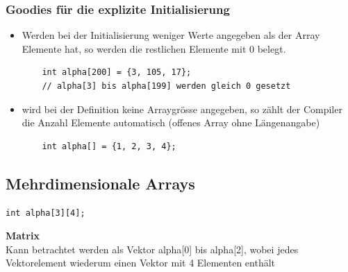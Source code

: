 \subsubsection{Goodies für die explizite Initialisierung}
\label{sec:Goodies fuer die explizite Initialisierung}
\begin{itemize}
	\item Werden bei der Initialisierung weniger Werte angegeben als der Array Elemente hat, so werden die restlichen Elemente mit 0 belegt.\\
	\noindent
	\begin{minipage}{\linewidth}
	\begin{lstlisting}
	int alpha[200] = {3, 105, 17};
	// alpha[3] bis alpha[199] werden gleich 0 gesetzt
	\end{lstlisting}
	\end{minipage}
	\item wird bei der Definition keine Arraygrösse angegeben, so zählt der Compiler die Anzahl Elemente automatisch (offenes Array ohne Längenangabe)
	\noindent
	\begin{minipage}{\linewidth}
	\begin{lstlisting}
	int alpha[] = {1, 2, 3, 4};
	\end{lstlisting}
	\end{minipage}
\end{itemize}


\subsection{Mehrdimensionale Arrays}
\label{sec:Mehrdimensionale Arrays}
\noindent
\begin{minipage}{\linewidth}
\begin{lstlisting}
int alpha[3][4];
\end{lstlisting}
\end{minipage}
\textbf{Matrix}\\
Kann betrachtet werden als Vektor alpha[0] bis alpha[2], wobei jedes Vektorelement wiederum einen Vektor mit 4 Elementen enthält\\
\vspace{5mm}
\begin{figure}[h]
	\centering
	
\end{figure}

